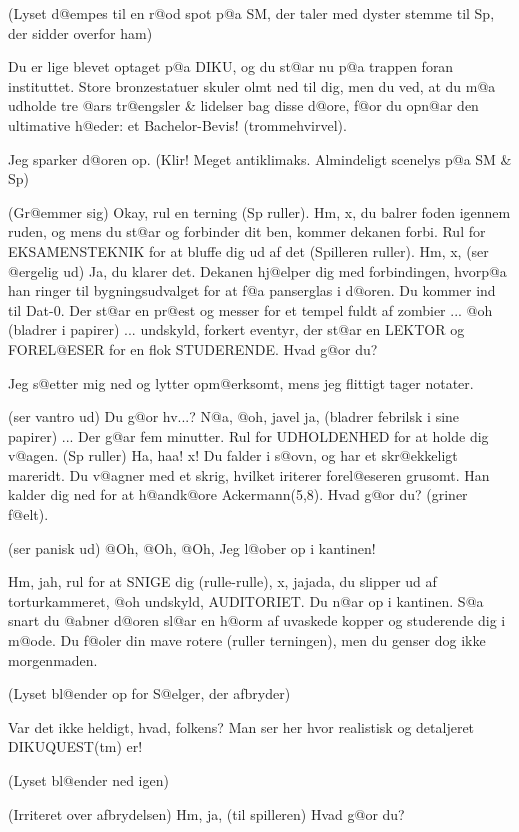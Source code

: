 \documentclass[a4paper,11pt]{article}
\begin{document}
\begin{sketch}
(Lyset d@empes til en r@od spot p@a SM, der taler med dyster stemme til Sp, der
sidder overfor ham) 

	Du er lige blevet optaget p@a DIKU, og du st@ar nu p@a
trappen foran instituttet. Store bronzestatuer skuler olmt ned til
dig, men du ved, at du m@a udholde tre @ars tr@engsler \& lidelser bag
disse d@ore, f@or du opn@ar den ultimative h@eder: et Bachelor-Bevis!
(trommehvirvel).

	Jeg sparker d@oren op. (Klir! Meget antiklimaks. Almindeligt scenelys
p@a SM \& Sp)

	(Gr@emmer sig) Okay, rul en terning (Sp ruller). Hm, x, du
balrer foden igennem ruden, og mens du st@ar og forbinder dit ben,
kommer dekanen forbi. Rul for EKSAMENS\-TEKNIK for at bluffe dig ud af
det (Spilleren ruller).  Hm, x, (ser @ergelig ud) Ja, du klarer det.
Dekanen hj@elper dig med forbindingen, hvorp@a han ringer til
bygningsudvalget for at f@a panserglas i d@oren. Du kommer ind til
Dat-0. Der st@ar en pr@est og messer for et tempel fuldt af zombier
... @oh (bladrer i papirer) ... undskyld, forkert eventyr, der st@ar
en LEKTOR og FOREL@ESER for en flok STUDERENDE. Hvad g@or du?

	Jeg s@etter mig ned og lytter opm@erksomt, mens jeg flittigt tager
notater. 

	(ser vantro ud) Du g@or hv...? N@a, @oh, javel ja, (bladrer
febrilsk i sine papirer) ... Der g@ar fem minutter. Rul for
UDHOLDENHED for at holde dig v@agen. (Sp ruller) Ha, haa! x! Du falder
i s@ovn, og har et skr@ekkeligt mareridt. Du v@agner med et skrig,
hvilket iriterer forel@eseren grusomt. Han kalder dig ned for at
h@andk@ore Ackermann(5,8). Hvad g@or du? (griner f@elt).

	(ser panisk ud) @Oh, @Oh, @Oh, Jeg l@ober op i kantinen!

	Hm, jah, rul for at SNIGE dig (rulle-rulle), x, jajada, du
slipper ud af torturkammeret, @oh undskyld, AUDITORIET. Du n@ar op i
kantinen. S@a snart du @abner d@oren sl@ar en h@orm af uvaskede kopper
og studerende dig i m@ode. Du f@oler din mave rotere (ruller
terningen), men du genser dog ikke morgenmaden.

(Lyset bl@ender op for S@elger, der afbryder)

	Var det ikke heldigt, hvad, folkens? Man ser her hvor
realistisk og detaljeret DIKUQUEST(tm) er!

(Lyset bl@ender ned igen)

	(Irriteret over afbrydelsen) Hm, ja, (til spilleren) Hvad g@or du?


\end{sketch}
\end{document}
